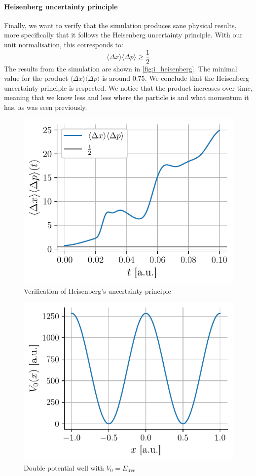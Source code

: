 \paragraph{Heisenberg uncertainty principle} Finally, we want to verify that the simulation produces sane physical results, more specifically that it follows the Heisenberg uncertainty principle. With our unit normalisation, this corresponds to:
\begin{equation}
    \langle \Delta x \rangle \langle \Delta p \rangle \ge \frac{1}{2}
\end{equation}
The results from the simulation are shown in \autoref{fig:i_heisenberg}. The minimal value for the product \(\langle \Delta x \rangle \langle \Delta p \rangle\) is around \(0.75\). We conclude that the Heisenberg uncertainty principle is respected. We notice that the product increases over time, meaning that we know less and less where the particle is and what momentum it has, as was seen previously.
\begin{figure}[H]
    \centering
    \includegraphics[width=0.45\linewidth]{figures/i_heisenberg.pdf}
    \caption{Verification of Heisenberg's uncertainty principle}
    \label{fig:i_heisenberg}
\end{figure}

\begin{figure}
    \includegraphics[width=\linewidth]{figures/potential.pdf}
    \caption{Double potential well with \mbox{$V_0 = E_\mathrm{free}$}}
    \label{fig:potential}
\end{figure}
